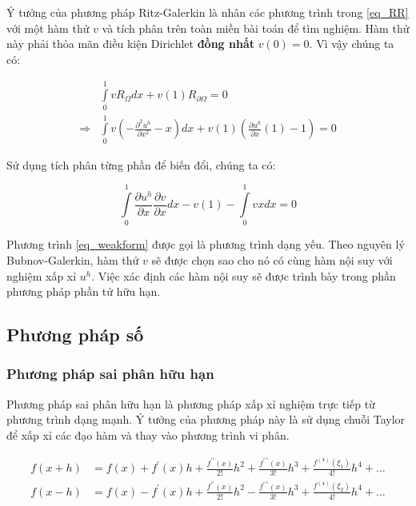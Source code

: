 Ý tưởng của phương pháp Ritz-Galerkin là nhân các phương trình trong \cref{eq_RR} với một hàm thử $v$ và tích phân trên toàn miền bài toán để tìm nghiệm. Hàm thử này phải thỏa mãn điều kiện Dirichlet \textbf{đồng nhất} $v(0) = 0$. Vì vậy chúng ta có:

\begin{equation}\label{eq_Ritz}
    \begin{aligned}
        &\int\limits_0^1 v R_{\Omega}dx + v(1)R_{\partial\Omega} = 0 \\
        \Rightarrow &\int\limits_0^1 v \left(-\frac{\partial^2 u^h}{\partial x^2} - x\right)dx + v(1)\left(\frac{\partial u^h}{\partial x} \left(1\right) - 1\right) =0
    \end{aligned}
\end{equation}

Sử dụng tích phân từng phần để biến đổi, chúng ta có:

\begin{equation}\label{eq_weakform}
    \int\limits_0^1 \frac{\partial u^h}{\partial x} \frac{\partial v}{\partial x}dx - v(1) - \int\limits_0^1 v x dx =0
\end{equation}

Phương trình \cref{eq_weakform} được gọi là phương trình dạng yếu. Theo nguyên lý Bubnov-Galerkin, hàm thử $v$ sẽ được chọn sao cho nó có cùng hàm nội suy với nghiệm xấp xỉ $u^h$. Việc xác định các hàm nội suy sẽ được trình bày trong phần phương pháp phần tử hữu hạn.

\subsection{Phương pháp số}

\subsubsection{Phương pháp sai phân hữu hạn}

Phương pháp sai phân hữu hạn là phương pháp xấp xỉ nghiệm trực tiếp từ phương trình dạng mạnh. Ý tưởng của phương pháp này là sử dụng chuỗi Taylor để xấp xỉ các đạo hàm và thay vào phương trình vi phân.

\begin{equation}\label{eq_taylor}
    \begin{aligned}
        f(x+h) &=f(x)+f^{\prime}(x) h+\frac{f^{\prime \prime}(x)}{2!} h^2+\frac{f^{\prime \prime \prime}(x)}{3!} h^3+\frac{f^{(4)}\left(\xi_1\right)}{4!} h^4 + \dots\\
        f(x-h) &=f(x)-f^{\prime}(x) h+\frac{f^{\prime \prime}(x)}{2!} h^2-\frac{f^{\prime \prime \prime}(x)}{3!} h^3+\frac{f^{(4)}\left(\xi_2\right)}{4!} h^4 + \dots
\end{aligned}
\end{equation}

